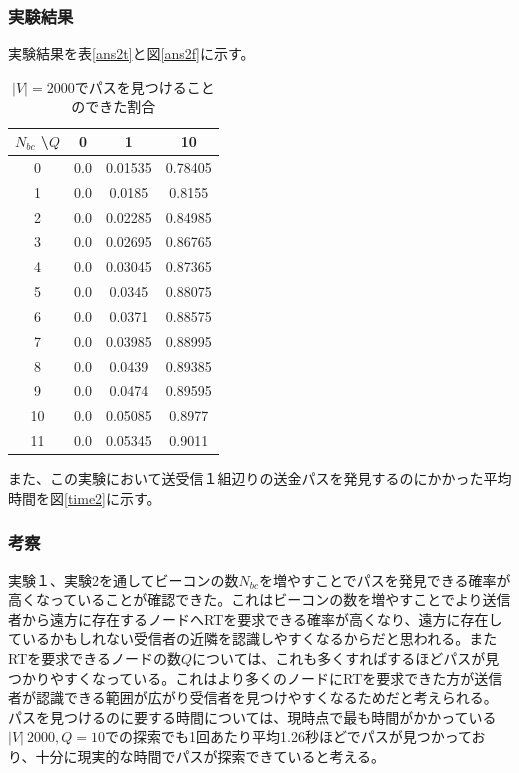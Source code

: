 \documentclass[12pt]{jarticle}
\begin{document}
\subsubsection{実験結果}
実験結果を表\ref{ans2t}と図\ref{ans2f}に示す。

\begin{table}[h]
	\begin{center}
    \caption{$|V|=2000$でパスを見つけることのできた割合}
		\begin{tabular}{|c|ccc|}
			\hline
            $N_{bc}$ \textbackslash $Q$ & 0 & 1 & 10\\
            \hline
			0 & 0.0 & 0.01535 & 0.78405 \\
			1 & 0.0 & 0.0185 & 0.8155\\
			2 & 0.0 & 0.02285 & 0.84985\\
			3 & 0.0 & 0.02695 & 0.86765\\
			4 & 0.0 & 0.03045 & 0.87365\\
			5 & 0.0 & 0.0345 & 0.88075 \\
			6 & 0.0 & 0.0371 & 0.88575 \\
			7 & 0.0 & 0.03985 & 0.88995\\
			8 & 0.0 & 0.0439 & 0.89385 \\
			9 & 0.0 & 0.0474 & 0.89595 \\
			10 & 0.0 & 0.05085 & 0.8977\\
			11 & 0.0 & 0.05345 & 0.9011\\
            \hline
		\end{tabular}
        \label{ans1t}
	\end{center}
\end{table}


また、この実験において送受信１組辺りの送金パスを発見するのにかかった平均時間を図\ref{time2}に示す。


\subsubsection{考察}
実験１、実験2を通してビーコンの数$N_{bc}$を増やすことでパスを発見できる確率が高くなっていることが確認できた。これはビーコンの数を増やすことでより送信者から遠方に存在するノードへRTを要求できる確率が高くなり、遠方に存在しているかもしれない受信者の近隣を認識しやすくなるからだと思われる。またRTを要求できるノードの数$Q$については、これも多くすればするほどパスが見つかりやすくなっている。これはより多くのノードにRTを要求できた方が送信者が認識できる範囲が広がり受信者を見つけやすくなるためだと考えられる。\\
パスを見つけるのに要する時間については、現時点で最も時間がかかっている$|V|~2000,Q=10$での探索でも1回あたり平均1.26秒ほどでパスが見つかっており、十分に現実的な時間でパスが探索できていると考える。
\end{document}
